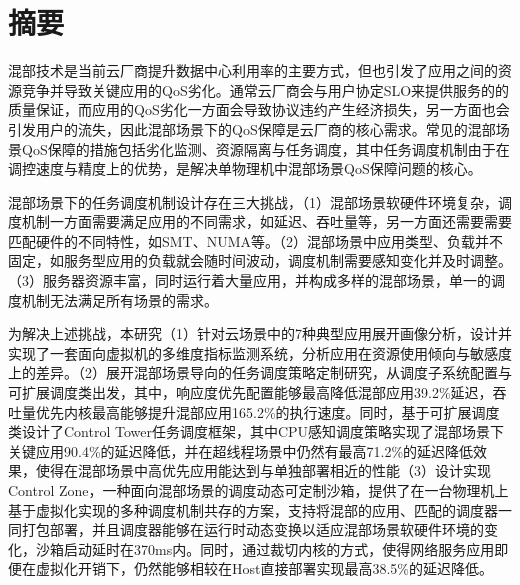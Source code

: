 
\maketitle%
\MAKETITLE%
\makedeclaration%
\intobmk\chapter*{摘\quad 要}%
\setcounter{page}{1}%


混部技术是当前云厂商提升数据中心利用率的主要方式，但也引发了应用之间的资源竞争并导致关键应用的QoS劣化。通常云厂商会与用户协定SLO来提供服务的的质量保证，而应用的QoS劣化一方面会导致协议违约产生经济损失，另一方面也会引发用户的流失，因此混部场景下的QoS保障是云厂商的核心需求。常见的混部场景QoS保障的措施包括劣化监测、资源隔离与任务调度，其中任务调度机制由于在调控速度与精度上的优势，是解决单物理机中混部场景QoS保障问题的核心。

混部场景下的任务调度机制设计存在三大挑战，（1）混部场景软硬件环境复杂，调度机制一方面需要满足应用的不同需求，如延迟、吞吐量等，另一方面还需要需要匹配硬件的不同特性，如SMT、NUMA等。（2）混部场景中应用类型、负载并不固定，如服务型应用的负载就会随时间波动，调度机制需要感知变化并及时调整。（3）服务器资源丰富，同时运行着大量应用，并构成多样的混部场景，单一的调度机制无法满足所有场景的需求。

为解决上述挑战，本研究（1）针对云场景中的7种典型应用展开画像分析，设计并实现了一套面向虚拟机的多维度指标监测系统，分析应用在资源使用倾向与敏感度上的差异。（2）展开混部场景导向的任务调度策略定制研究，从调度子系统配置与可扩展调度类出发，其中，响应度优先配置能够最高降低混部应用39.2\%延迟，吞吐量优先内核最高能够提升混部应用165.2\%的执行速度。同时，基于可扩展调度类设计了Control Tower任务调度框架，其中CPU感知调度策略实现了混部场景下关键应用90.4\%的延迟降低，并在超线程场景中仍然有最高71.2\%的延迟降低效果，使得在混部场景中高优先应用能达到与单独部署相近的性能（3）设计实现Control Zone，一种面向混部场景的调度动态可定制沙箱，提供了在一台物理机上基于虚拟化实现的多种调度机制共存的方案，支持将混部的应用、匹配的调度器一同打包部署，并且调度器能够在运行时动态变换以适应混部场景软硬件环境的变化，沙箱启动延时在370ms内。同时，通过裁切内核的方式，使得网络服务应用即便在虚拟化开销下，仍然能够相较在Host直接部署实现最高38.5\%的延迟降低。

